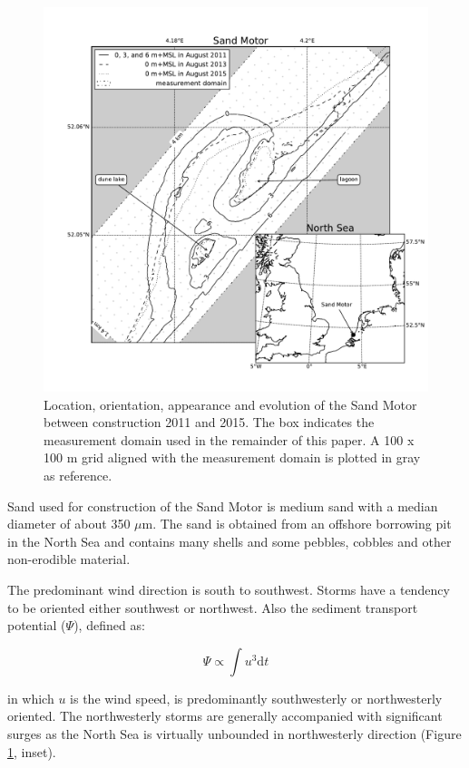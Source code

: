 \begin{figure}
  \centering
  \includegraphics[width=\columnwidth]{../Figures/location_and_evolution}
  \caption{Location, orientation, appearance and evolution of the Sand
    Motor between construction 2011 and 2015. The box indicates the
    measurement domain used in the remainder of this paper. A 100 x
    100 m grid aligned with the measurement domain is plotted in gray
    as reference.}
  \label{fig:fieldsite2}
\end{figure}

Sand used for construction of the Sand Motor is medium sand with a
median diameter of about 350 $\mu \mathrm{m}$. The sand is obtained
from an offshore borrowing pit in the North Sea and contains many
shells and some pebbles, cobbles and other non-erodible material.

The predominant wind direction is south to southwest. Storms have a
tendency to be oriented either southwest or northwest. Also the
sediment transport potential ($\Psi$), defined as:

\begin{equation}
  \label{eq:transport_potential}
  \Psi \propto \int u^3 \mathrm{d}t
\end{equation}

\noindent in which $u$ is the wind speed, is predominantly
southwesterly or northwesterly oriented. The northwesterly storms are
generally accompanied with significant surges as the North Sea is
virtually unbounded in northwesterly direction (Figure
\ref{fig:fieldsite2}, inset).

